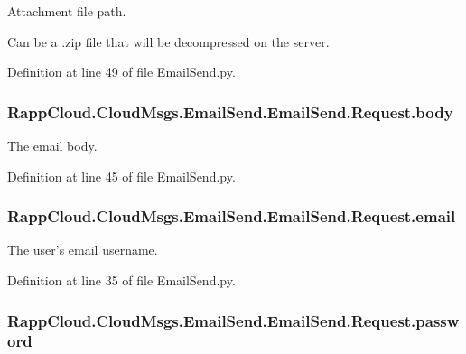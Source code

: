 Attachment file path. 

Can be a .zip file that will be decompressed on the server. 

Definition at line 49 of file Email\-Send.\-py.

\hypertarget{classRappCloud_1_1CloudMsgs_1_1EmailSend_1_1EmailSend_1_1Request_a9abafdaac60f40b3183e8938dca5108a}{
\subsubsection[{body}]{\setlength{\rightskip}{0pt plus 5cm}Rapp\-Cloud.\-Cloud\-Msgs.\-Email\-Send.\-Email\-Send.\-Request.\-body}}\label{classRappCloud_1_1CloudMsgs_1_1EmailSend_1_1EmailSend_1_1Request_a9abafdaac60f40b3183e8938dca5108a}


The email body. 



Definition at line 45 of file Email\-Send.\-py.

\hypertarget{classRappCloud_1_1CloudMsgs_1_1EmailSend_1_1EmailSend_1_1Request_acd47a0fab97f1bf655d847cf5bc037f4}{
\subsubsection[{email}]{\setlength{\rightskip}{0pt plus 5cm}Rapp\-Cloud.\-Cloud\-Msgs.\-Email\-Send.\-Email\-Send.\-Request.\-email}}\label{classRappCloud_1_1CloudMsgs_1_1EmailSend_1_1EmailSend_1_1Request_acd47a0fab97f1bf655d847cf5bc037f4}


The user's email username. 



Definition at line 35 of file Email\-Send.\-py.

\hypertarget{classRappCloud_1_1CloudMsgs_1_1EmailSend_1_1EmailSend_1_1Request_afafc9e4063bae627f3ef8734b5d43616}{
\subsubsection[{password}]{\setlength{\rightskip}{0pt plus 5cm}Rapp\-Cloud.\-Cloud\-Msgs.\-Email\-Send.\-Email\-Send.\-Request.\-password}}\label{classRappCloud_1_1CloudMsgs_1_1EmailSend_1_1EmailSend_1_1Request_afafc9e4063bae627f3ef8734b5d43616}


